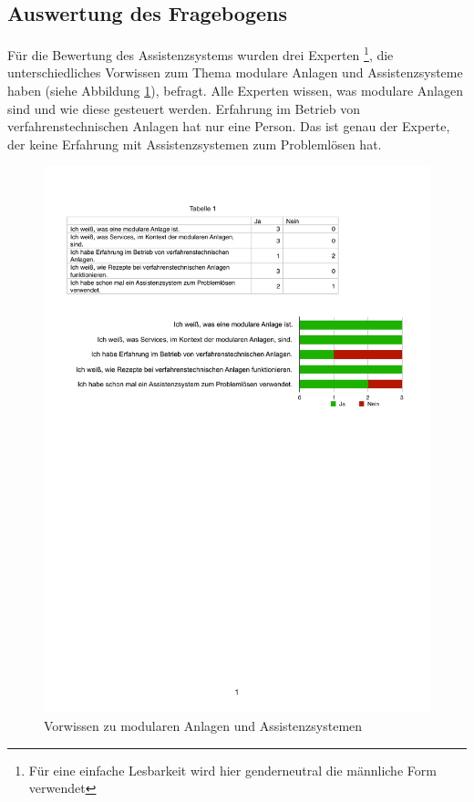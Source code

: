 \subsection{Auswertung des Fragebogens}
Für die Bewertung des Assistenzsystems wurden drei Experten \footnote{Für eine einfache Lesbarkeit wird hier genderneutral die männliche Form verwendet}, die unterschiedliches Vorwissen zum Thema modulare Anlagen und Assistenzsysteme haben (siehe Abbildung \ref{pic:Fragebogen-Vorwissen}), befragt. Alle Experten wissen, was modulare Anlagen sind und wie diese gesteuert werden. Erfahrung im Betrieb von verfahrenstechnischen Anlagen hat nur eine Person. Das ist genau der Experte, der keine Erfahrung mit Assistenzsystemen zum Problemlösen hat.
\begin{figure}[htbp]
\centering
\includegraphics[scale=0.65]{DA_files/Bilder/Validierung/Bild-Vorwissen.pdf}
\caption{Vorwissen zu modularen Anlagen und Assistenzsystemen}
\label{pic:Fragebogen-Vorwissen}
\end{figure}

